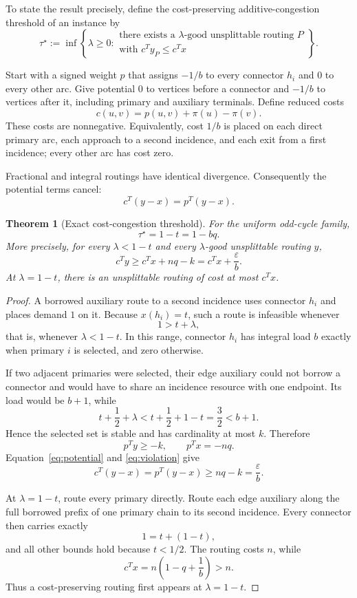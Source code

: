 \documentclass[11pt]{article}
\newtheorem{theorem}{Theorem}
\theoremstyle{definition}
\begin{document}
To state the result precisely, define the cost-preserving additive-congestion threshold of an instance by
\[
\tau^\star
:=\inf\left\{\lambda\ge0:
\begin{array}{l}
\text{there exists a \(\lambda\)-good unsplittable routing \(P\)}\\[-2pt]
\text{with \(c^Ty_P\le c^Tx\)}
\end{array}\right\}.
\]

Start with a signed weight \(p\) that assigns \(-1/b\) to every connector \(h_i\) and \(0\) to every other arc. Give potential \(0\) to vertices before a connector and \(-1/b\) to vertices after it, including primary and auxiliary terminals. Define reduced costs
\[
c(u,v)=p(u,v)+\pi(u)-\pi(v).
\]
These costs are nonnegative. Equivalently, cost \(1/b\) is placed on each direct primary arc, each approach to a second incidence, and each exit from a first incidence; every other arc has cost zero.

Fractional and integral routings have identical divergence. Consequently the potential terms cancel:
\begin{equation}\label{eq:potential}
c^T(y-x)=p^T(y-x).
\end{equation}

\begin{theorem}[Exact cost-congestion threshold]\label{thm:threshold}
For the uniform odd-cycle family,
\[
\tau^\star=1-t=1-bq.
\]
More precisely, for every \(\lambda<1-t\) and every \(\lambda\)-good unsplittable routing \(y\),
\[
c^Ty\ge c^Tx+nq-k
=c^Tx+\frac{\varepsilon}{b}.
\]
At \(\lambda=1-t\), there is an unsplittable routing of cost at most \(c^Tx\).
\end{theorem}

\begin{proof}
A borrowed auxiliary route to a second incidence uses connector \(h_i\) and places demand \(1\) on it. Because \(x(h_i)=t\), such a route is infeasible whenever
\[
1>t+\lambda,
\]
that is, whenever \(\lambda<1-t\). In this range, connector \(h_i\) has integral load \(b\) exactly when primary \(i\) is selected, and zero otherwise.

If two adjacent primaries were selected, their edge auxiliary could not borrow a connector and would have to share an incidence resource with one endpoint. Its load would be \(b+1\), while
\[
t+\frac12+\lambda
<t+\frac12+1-t
=\frac32
<b+1.
\]
Hence the selected set is stable and has cardinality at most \(k\). Therefore
\[
p^Ty\ge-k,
\qquad
p^Tx=-nq.
\]
Equation~\eqref{eq:potential} and \eqref{eq:violation} give
\[
c^T(y-x)=p^T(y-x)\ge nq-k=\frac{\varepsilon}{b}.
\]

At \(\lambda=1-t\), route every primary directly. Route each edge auxiliary along the full borrowed prefix of one primary chain to its second incidence. Every connector then carries exactly
\[
1=t+(1-t),
\]
and all other bounds hold because \(t<1/2\). The routing costs \(n\), while
\[
c^Tx=n\left(1-q+\frac1b\right)>n.
\]
Thus a cost-preserving routing first appears at \(\lambda=1-t\).
\end{proof}
\end{document}
